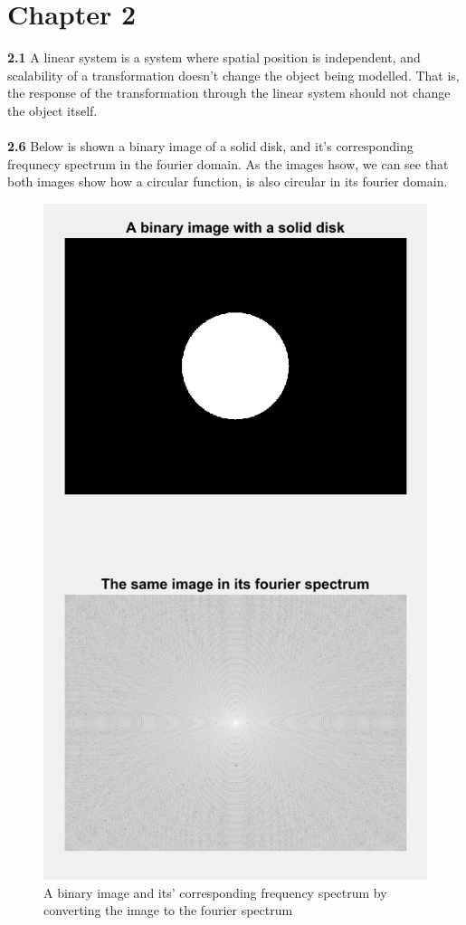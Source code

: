 \documentclass[]{article}
\begin{document}
\section{Chapter 2}
\textbf{2.1} A linear system is a system where spatial position is independent, and scalability of a transformation doesn't change the object being modelled. That is, the response of the transformation through the linear system should not change the object itself.\\\\
\textbf{2.6}
Below is shown a binary image of a solid disk, and it's corresponding frequnecy spectrum in the fourier domain. As the images hsow, we can see that both images show how a circular function, is also circular in its fourier domain.
\begin{figure}[H]
\centering
\includegraphics[scale=0.75]{disc.PNG}
\caption{A binary image and its' corresponding frequency spectrum by converting the image to the fourier spectrum}
\end{figure}
\end{document}
